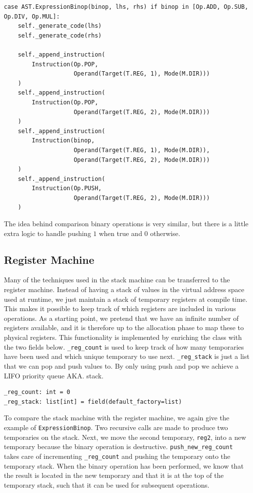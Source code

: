 \begin{verbatim}
case AST.ExpressionBinop(binop, lhs, rhs) if binop in [Op.ADD, Op.SUB, Op.DIV, Op.MUL]:
    self._generate_code(lhs)
    self._generate_code(rhs)

    self._append_instruction(
        Instruction(Op.POP,
                    Operand(Target(T.REG, 1), Mode(M.DIR)))
    )
    self._append_instruction(
        Instruction(Op.POP,
                    Operand(Target(T.REG, 2), Mode(M.DIR)))
    )
    self._append_instruction(
        Instruction(binop,
                    Operand(Target(T.REG, 1), Mode(M.DIR)),
                    Operand(Target(T.REG, 2), Mode(M.DIR)))
    )
    self._append_instruction(
        Instruction(Op.PUSH,
                    Operand(Target(T.REG, 2), Mode(M.DIR)))
    )
\end{verbatim}

The idea behind comparison binary operations is very similar, but there is a little extra logic to handle pushing $1$ when true and $0$ otherwise.

\subsection{Register Machine}\label{sec:register_machine}
Many of the techniques used in the stack machine can be transferred to the register machine. Instead of having a stack of values in the virtual address space used at runtime, we just maintain a stack of temporary registers at compile time. This makes it possible to keep track of which registers are included in various operations. As a starting point, we pretend that we have an infinite number of registers available, and it is therefore up to the allocation phase to map these to physical registers. This functionality is implemented by enriching the class with the two fields below. \texttt{\_reg\_count} is used to keep track of how many temporaries have been used and which unique temporary to use next. \texttt{\_reg\_stack} is just a list that we can pop and push values to. By only using push and pop we achieve a LIFO priority queue AKA. stack.

\begin{verbatim}
_reg_count: int = 0
_reg_stack: list[int] = field(default_factory=list)
\end{verbatim}

To compare the stack machine with the register machine, we again give the example of \texttt{ExpressionBinop}. Two recursive calls are made to produce two temporaries on the stack. Next, we move the second temporary, \texttt{reg2}, into a new temporary because the binary operation is destructive. \texttt{push\_new\_reg\_count} takes care of incrementing \texttt{\_reg\_count} and pushing the temporary onto the temporary stack. When the binary operation has been performed, we know that the result is located in the new temporary and that it is at the top of the temporary stack, such that it can be used for subsequent operations.

